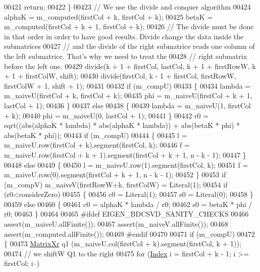 \begin{DoxyCode}
00421     \textcolor{keywordflow}{return};
00422   \}
00423   \textcolor{comment}{// We use the divide and conquer algorithm}
00424   alphaK =  m\_computed(firstCol + k, firstCol + k);
00425   betaK = m\_computed(firstCol + k + 1, firstCol + k);
00426   \textcolor{comment}{// The divide must be done in that order in order to have good results. Divide change the data inside the
       submatrices}
00427   \textcolor{comment}{// and the divide of the right submatrice reads one column of the left submatrice. That's why we need to
       treat the }
00428   \textcolor{comment}{// right submatrix before the left one. }
00429   divide(k + 1 + firstCol, lastCol, k + 1 + firstRowW, k + 1 + firstColW, shift);
00430   divide(firstCol, k - 1 + firstCol, firstRowW, firstColW + 1, shift + 1);
00431 
00432   \textcolor{keywordflow}{if} (m\_compU)
00433   \{
00434     lambda = m\_naiveU(firstCol + k, firstCol + k);
00435     phi = m\_naiveU(firstCol + k + 1, lastCol + 1);
00436   \} 
00437   \textcolor{keywordflow}{else} 
00438   \{
00439     lambda = m\_naiveU(1, firstCol + k);
00440     phi = m\_naiveU(0, lastCol + 1);
00441   \}
00442   r0 = sqrt((abs(alphaK * lambda) * abs(alphaK * lambda)) + abs(betaK * phi) * abs(betaK * phi));
00443   \textcolor{keywordflow}{if} (m\_compU)
00444   \{
00445     l = m\_naiveU.row(firstCol + k).segment(firstCol, k);
00446     f = m\_naiveU.row(firstCol + k + 1).segment(firstCol + k + 1, n - k - 1);
00447   \} 
00448   \textcolor{keywordflow}{else} 
00449   \{
00450     l = m\_naiveU.row(1).segment(firstCol, k);
00451     f = m\_naiveU.row(0).segment(firstCol + k + 1, n - k - 1);
00452   \}
00453   \textcolor{keywordflow}{if} (m\_compV) m\_naiveV(firstRowW+k, firstColW) = Literal(1);
00454   \textcolor{keywordflow}{if} (r0<considerZero)
00455   \{
00456     c0 = Literal(1);
00457     s0 = Literal(0);
00458   \}
00459   \textcolor{keywordflow}{else}
00460   \{
00461     c0 = alphaK * lambda / r0;
00462     s0 = betaK * phi / r0;
00463   \}
00464   
00465 \textcolor{preprocessor}{#ifdef EIGEN\_BDCSVD\_SANITY\_CHECKS}
00466   assert(m\_naiveU.allFinite());
00467   assert(m\_naiveV.allFinite());
00468   assert(m\_computed.allFinite());
00469 \textcolor{preprocessor}{#endif}
00470   
00471   \textcolor{keywordflow}{if} (m\_compU)
00472   \{
00473     \hyperlink{group___core___module}{MatrixXr} q1 (m\_naiveU.col(firstCol + k).segment(firstCol, k + 1));     
00474     \textcolor{comment}{// we shiftW Q1 to the right}
00475     \textcolor{keywordflow}{for} (\hyperlink{namespace_eigen_a62e77e0933482dafde8fe197d9a2cfde}{Index} i = firstCol + k - 1; i >= firstCol; i--) 

\end{DoxyCode}
